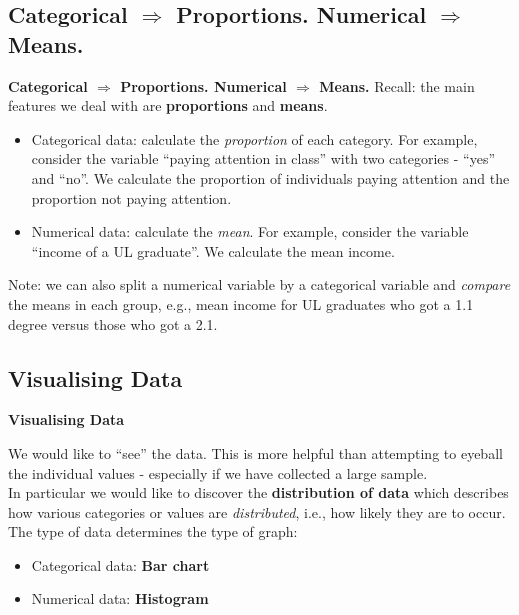 \documentclass[compress]{beamer}        %
\makeatletter
\newcommand{\tcb}{\textcolor{beamer@blendedblue}}
\makeatother
\begin{document}
\subsection{Categorical $\Rightarrow$ Proportions. Numerical $\Rightarrow$ Means.}
\begin{frame}{\bf \tcb{Categorical $\Rightarrow$ Proportions. Numerical $\Rightarrow$ Means.}}
Recall: the main features we deal with are {\bf proportions} and {\bf means}.\\[0.2cm]
\begin{itemize}\itemsep0.5cm
\item Categorical data: calculate the \emph{proportion} of each category. For example, consider the variable ``paying attention in class'' with two categories - ``yes'' and ``no''. We calculate the proportion of individuals paying attention and the proportion not paying attention.
\item Numerical data: calculate the \emph{mean}. For example, consider the variable ``income of a UL graduate''. We calculate the mean income.\\[0.6cm]
\end{itemize}

Note: we can also split a numerical variable by a categorical variable and \emph{compare} the means in each group, e.g., mean income for UL graduates who got a 1.1 degree versus those who got a 2.1.
\end{frame}


\subsection{Visualising Data}
\begin{frame}{\bf \tcb{Visualising Data}}

We would like to ``see'' the data. This is more helpful than attempting to eyeball the individual values - especially if we have collected a large sample.\\[0.4cm]

In particular we would like to discover the {\bf distribution of data} which describes how various categories or values are \emph{distributed}, i.e., how likely they are to occur.\\[0.6cm]

The type of data determines the type of graph:\\[0.2cm]
\begin{itemize}\itemsep0.3cm
\item Categorical data: {\bf Bar chart}
\item Numerical data: {\bf Histogram}
\end{itemize}

\end{frame}
\end{document}
